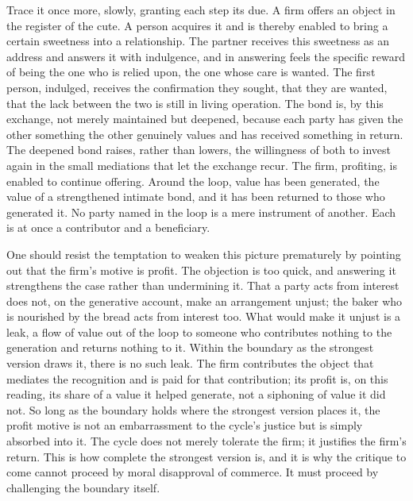 Trace it once more, slowly, granting each step its due. A firm offers an object in the register of the cute. A person acquires it and is thereby enabled to bring a certain sweetness into a relationship. The partner receives this sweetness as an address and answers it with indulgence, and in answering feels the specific reward of being the one who is relied upon, the one whose care is wanted. The first person, indulged, receives the confirmation they sought, that they are wanted, that the lack between the two is still in living operation. The bond is, by this exchange, not merely maintained but deepened, because each party has given the other something the other genuinely values and has received something in return. The deepened bond raises, rather than lowers, the willingness of both to invest again in the small mediations that let the exchange recur. The firm, profiting, is enabled to continue offering. Around the loop, value has been generated, the value of a strengthened intimate bond, and it has been returned to those who generated it. No party named in the loop is a mere instrument of another. Each is at once a contributor and a beneficiary.

One should resist the temptation to weaken this picture prematurely by pointing out that the firm's motive is profit. The objection is too quick, and answering it strengthens the case rather than undermining it. That a party acts from interest does not, on the generative account, make an arrangement unjust; the baker who is nourished by the bread acts from interest too. What would make it unjust is a leak, a flow of value out of the loop to someone who contributes nothing to the generation and returns nothing to it. Within the boundary as the strongest version draws it, there is no such leak. The firm contributes the object that mediates the recognition and is paid for that contribution; its profit is, on this reading, its share of a value it helped generate, not a siphoning of value it did not. So long as the boundary holds where the strongest version places it, the profit motive is not an embarrassment to the cycle's justice but is simply absorbed into it. The cycle does not merely tolerate the firm; it justifies the firm's return. This is how complete the strongest version is, and it is why the critique to come cannot proceed by moral disapproval of commerce. It must proceed by challenging the boundary itself.

